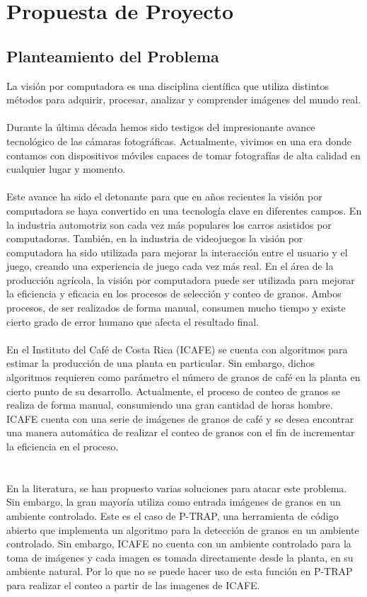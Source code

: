 \section{\textbf{Propuesta de Proyecto}}
\subsection{Planteamiento del Problema}
La visi\'on por computadora es una disciplina cient\'ifica que utiliza distintos m\'etodos para adquirir, procesar, analizar y comprender im\'agenes del mundo real. 
\\\\
Durante la \'ultima d\'ecada hemos sido testigos del impresionante avance tecnol\'ogico de las c\'amaras fotogr\'aficas. Actualmente, vivimos en una era donde contamos con dispositivos m\'oviles capaces de tomar fotograf\'ias de alta calidad en cualquier lugar y momento. 
\\\\
Este avance ha sido el detonante para que en a\~nos recientes la visi\'on por computadora se haya convertido en una tecnolog\'ia clave en diferentes campos. En la industria automotriz son cada vez m\'as populares los carros asistidos por computadoras. Tambi\'en, en la industria de videojuegos la visi\'on por computadora ha sido utilizada para mejorar la interacci\'on entre el usuario y el juego, creando una experiencia de juego cada vez m\'as real. En el \'area de la producci\'on agr\'icola, la visi\'on por computadora puede ser utilizada para mejorar la eficiencia y eficacia en los procesos de selecci\'on y conteo de granos. Ambos procesos, de ser realizados de forma manual, consumen mucho tiempo y existe cierto grado de error humano que afecta el resultado final.
\\\\
En el Instituto del Caf\'e de Costa Rica (ICAFE) se cuenta con algoritmos para estimar la producci\'on de una planta en particular. Sin embargo, dichos algoritmos requieren como par\'ametro el n\'umero de granos de caf\'e en la planta en cierto punto de su desarrollo. Actualmente, el proceso de conteo de granos se realiza de forma manual, consumiendo una gran cantidad de horas hombre. ICAFE cuenta con una serie de im\'agenes de granos de caf\'e y se desea encontrar una manera autom\'atica de realizar el conteo de granos con el fin de incrementar la eficiencia en el proceso.
\\\\\\
En la literatura, se han propuesto varias soluciones para atacar este problema. Sin embargo, la gran mayor\'ia utiliza como entrada im\'agenes de granos en un ambiente controlado. Este es el caso de P-TRAP, una herramienta de c\'odigo abierto que implementa un algoritmo para la detecci\'on de granos en un ambiente controlado. Sin embargo, ICAFE no cuenta con un ambiente controlado para la toma de im\'agenes y cada imagen es tomada directamente desde la planta, en su ambiente natural. Por lo que no se puede hacer uso de esta funci\'on en P-TRAP para realizar el conteo a partir de las imagenes de ICAFE.
